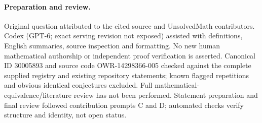 \documentclass[11pt]{article}
\begin{document}
\paragraph{Preparation and review.}
Original question attributed to the cited source and UnsolvedMath contributors. Codex (GPT-6; exact serving revision not exposed) assisted with definitions, English summaries, source inspection and formatting. No new human mathematical authorship or independent proof verification is asserted. Canonical ID 30005893 and source code OWR-14298366-005 checked against the complete supplied registry and existing repository statements; known flagged repetitions and obvious identical conjectures excluded. Full mathematical-equivalence/literature review has not been performed. Statement preparation and final review followed contribution prompts C and D; automated checks verify structure and identity, not open status.
\label{end:30005893}
\end{document}
